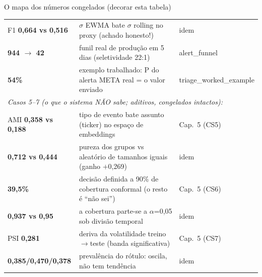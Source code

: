 \documentclass[aspectratio=169,11pt]{beamer}
\begin{document}
\begin{frame}{O mapa dos números congelados (decorar esta tabela)}
\begin{tabular}{l l l}
F1 \textbf{0,664 vs 0,516} & $\sigma$ EWMA bate $\sigma$ rolling no proxy (achado honesto!) & idem \\
\textbf{944 $\to$ 42} & funil real de produção em 5 dias (seletividade 22:1) & alert\_funnel \\
\textbf{54\%} & exemplo trabalhado: P do alerta META real = o valor enviado & triage\_worked\_example \\
\midrule
\multicolumn{3}{l}{\emph{Casos 5--7 (o que o sistema NÃO sabe; aditivos, congelados intactos):}} \\
AMI \textbf{0,358 vs 0,188} & tipo de evento bate assunto (ticker) no espaço de embeddings & Cap.~5 (CS5) \\
\textbf{0,712 vs 0,444} & pureza dos grupos vs aleatório de tamanhos iguais (ganho $+$0,269) & idem \\
\textbf{39,5\%} & decisão definida a 90\% de cobertura conformal (o resto é ``não sei'') & Cap.~5 (CS6) \\
\textbf{0,937 vs 0,95} & a cobertura parte-se a $\alpha$=0,05 sob divisão temporal & idem \\
PSI \textbf{0,281} & deriva da volatilidade treino$\to$teste (banda significativa) & Cap.~5 (CS7) \\
\textbf{0,385/0,470/0,378} & prevalência do rótulo: oscila, não tem tendência & idem \\
\bottomrule
\end{tabular}
\end{frame}
\end{document}
